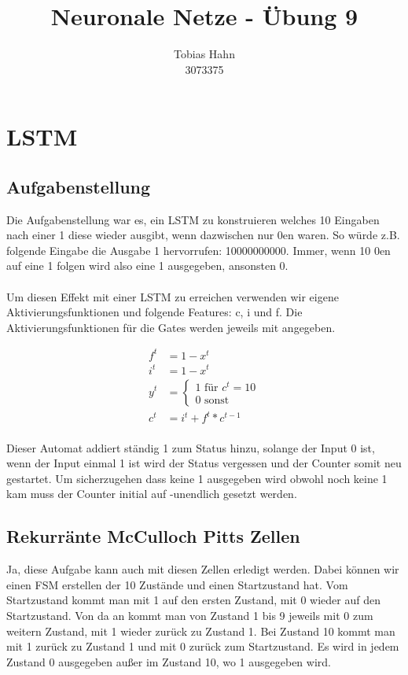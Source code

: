 \documentclass{article}
\title{Neuronale Netze - Übung 9}
\author{Tobias Hahn\\ 3073375}
\begin{document}
\maketitle
\newpage
\section{LSTM}
\subsection{Aufgabenstellung}
Die Aufgabenstellung war es, ein LSTM zu konstruieren welches 10 Eingaben nach einer 1 diese wieder ausgibt, wenn dazwischen nur 0en waren. So würde z.B. folgende Eingabe die Ausgabe 1 hervorrufen: 10000000000. Immer, wenn 10 0en auf eine 1 folgen wird also eine 1 ausgegeben, ansonsten 0.
\paragraph{}
Um diesen Effekt mit einer LSTM zu erreichen verwenden wir eigene Aktivierungsfunktionen und folgende Features: c, i und f. Die Aktivierungsfunktionen für die Gates werden jeweils mit angegeben.

\begin{align*}
	f^t &= 1 - x^t \\
	i^t &= 1 - x^t \\
	y^t &= \begin{cases}
		1 \text{ für } c^t = 10 \\
		0 \text{ sonst}
	\end{cases} \\
	c^t &= i^t + f^t * c^{t-1}
\end{align*}
\paragraph{}
Dieser Automat addiert ständig 1 zum Status hinzu, solange der Input 0 ist, wenn der Input einmal 1 ist wird der Status vergessen und der Counter somit neu gestartet. Um sicherzugehen dass keine 1 ausgegeben wird obwohl noch keine 1 kam muss der Counter initial auf -unendlich gesetzt werden.

\subsection{Rekurränte McCulloch Pitts Zellen}
Ja, diese Aufgabe kann auch mit diesen Zellen erledigt werden. Dabei können wir einen FSM erstellen der 10 Zustände und einen Startzustand hat. Vom Startzustand kommt man mit 1 auf den ersten Zustand, mit 0 wieder auf den Startzustand. Von da an kommt man von Zustand 1 bis 9 jeweils mit 0 zum weitern Zustand, mit 1 wieder zurück zu Zustand 1. Bei Zustand 10 kommt man mit 1 zurück zu Zustand 1 und mit 0 zurück zum Startzustand. Es wird in jedem Zustand 0 ausgegeben außer im Zustand 10, wo 1 ausgegeben wird.
\end{document}
